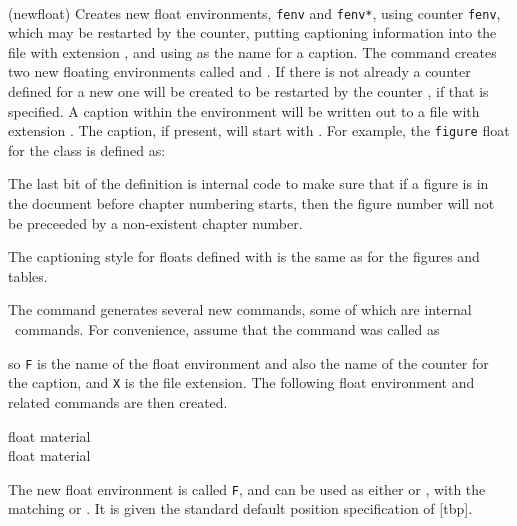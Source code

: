 \begin{syntax}
 \cmd{\newfloat} \\
\end{syntax}
\glossary(newfloat)%
  {}%
  {Creates new float environments, \texttt{fenv} and \texttt{fenv*},
   using counter \texttt{fenv}, which may be restarted by the 
    counter, putting captioning information into the
   file with extension , and using  as the
   name for a caption.}
 The \cmd{\newfloat} command creates two new floating environments 
called  and . If there
is not already a counter defined for  a new 
one will be created to be restarted by the counter , 
if that is specified.  A caption within the environment 
will be written out to a file with extension .
The caption, if present, will start with . For example, 
the \texttt{figure} float for the class 
is defined as:
\begin{lcode}
\renewcommand{\thefigure}{%
  \ifnum\c@chapter>\z@ \thechapter.\fi \@arabic\c@figure}
\end{lcode}
The last bit of the definition is internal code to make sure that if a
figure is in the document before chapter numbering starts, 
then the figure number will not be preceeded by a 
non-existent chapter number.

 The captioning style for floats defined 
with \cmd{\newfloat} is the same as
for the figures and tables.

    The \cmd{\newfloat} command generates several new commands, some of
which are internal \ltx\ commands. For convenience, assume that the 
command was called as 
\begin{lcode}
\end{lcode}
so \texttt{F} is the name of the float environment and also the name of 
the counter for the caption, and \texttt{X} is the file extension.
The following float environment and related commands are then created.

\begin{syntax}
 float material  \\
 float material  \\
\end{syntax}
 The new float environment is called \texttt{F}, and can be used as 
either  or , with the matching  or .
It is given the standard default position 
specification of 
[\textsf{t}\textsf{b}\textsf{p}].

